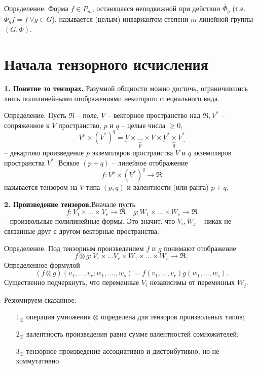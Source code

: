 \documentclass[a4paper, 12pt]{article} %
\begin{document}
Определение. Форма $f \in P_m$, остающаяся неподвижной при действии $\widetilde{\Phi_g}$ (т.е. $\widetilde{\Phi_g}f = f \ \forall g \in G$), называется (целым) инвариантом степени $m$ линейной группы $(G, \Phi)$.

\clearpage
\section*{Начала тензорного исчисления}
\textbf{1. Понятие то тензорах.} Разумной общности можно достичь, ограничившись лишь полилинейными отображениями некоторого специального вида.

Определение. Пусть $\Re$ -- поле, $V$ -- векторное пространство над $\Re, V^*$ -- сопряженное к $V$ пространство, $p$ и $q$ -- целые числа $\geq 0,$
\begin{equation}
    V^p \times (V^*)^q = \underbrace{V \times ... \times V}_{p} \times \underbrace{V^* \times V^*}_{q}
\end{equation}
-- декартово произведение $p$ экземпляров пространства $V$ и $q$ экземпляров пространства $V^*$. Всякое $(p + q)$ -- линейное отображение
\begin{equation}
    f: V^p \times (V^*)^q \to \Re
\end{equation}
называется тензором на $V$ типа $(p, q)$ и валентности (или ранга) $p + q$.

\textbf{2. Произведение тензоров.}Вначале пусть
\begin{equation}
    f: V_1 \times ... \times V_r \to \Re ~~~~~ g: W_1 \times ... \times W_s \to \Re
\end{equation}
-- произвольные полилинейные формы. Это значит, что $V_i, W_j$ -- никак не связанные друг с другом векторные пространства.

Определение. Под тензорным произведением $f$ и $g$ понимают отображение
\begin{equation}
    f \otimes g: V_1 \times ... V_r \times W_1 \times ... \times W_s \to \Re,
\end{equation}
Определенное формулой
\begin{equation}
    (f \otimes g)(v_1, ..., v_r; w_1, ...., w_s) = f(v_1, ..., v_r)g(w_1, ..., w_s).
\end{equation}
Существенно подчеркнуть, что переменные $V_i$ независимы от переменных $W_j$.

Резюмируем сказанное:
\begin{enumerate}
    \item [$1_\otimes$] операция умножения $\otimes$ определена для тензоров произвольных типов;
    \item [$2_\otimes$] валентность произведения равна сумме валентностей сомножителей;
    \item [$3_\otimes$] тензорное произведение ассоциативно и дистрибутивно, но не коммутативно.
\end{enumerate}
\end{document}
